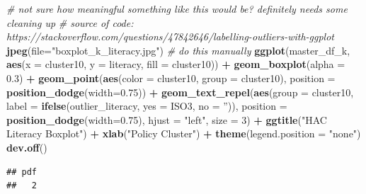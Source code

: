 \documentclass[]{article}
\newenvironment{Shaded}{\begin{snugshade}}{\end{snugshade}}
\newcommand{\CommentTok}[1]{\textcolor[rgb]{0.56,0.35,0.01}{\textit{#1}}}
\newcommand{\DataTypeTok}[1]{\textcolor[rgb]{0.13,0.29,0.53}{#1}}
\newcommand{\DecValTok}[1]{\textcolor[rgb]{0.00,0.00,0.81}{#1}}
\newcommand{\FloatTok}[1]{\textcolor[rgb]{0.00,0.00,0.81}{#1}}
\newcommand{\KeywordTok}[1]{\textcolor[rgb]{0.13,0.29,0.53}{\textbf{#1}}}
\newcommand{\NormalTok}[1]{#1}
\newcommand{\OperatorTok}[1]{\textcolor[rgb]{0.81,0.36,0.00}{\textbf{#1}}}
\newcommand{\StringTok}[1]{\textcolor[rgb]{0.31,0.60,0.02}{#1}}
\begin{document}
\begin{Shaded}
\begin{Highlighting}[]
\CommentTok{# not sure how meaningful something like this would be? definitely needs some cleaning up}
\CommentTok{# source of code: https://stackoverflow.com/questions/47842646/labelling-outliers-with-ggplot}
\KeywordTok{jpeg}\NormalTok{(}\DataTypeTok{file=}\StringTok{"boxplot_k_literacy.jpg"}\NormalTok{)}
\CommentTok{# do this manually}
\KeywordTok{ggplot}\NormalTok{(master_df_k, }\KeywordTok{aes}\NormalTok{(}\DataTypeTok{x =}\NormalTok{ cluster10, }\DataTypeTok{y =}\NormalTok{ literacy, }\DataTypeTok{fill =}\NormalTok{ cluster10)) }\OperatorTok{+}
\StringTok{  }\KeywordTok{geom_boxplot}\NormalTok{(}\DataTypeTok{alpha =} \FloatTok{0.3}\NormalTok{) }\OperatorTok{+}
\StringTok{  }\KeywordTok{geom_point}\NormalTok{(}\KeywordTok{aes}\NormalTok{(}\DataTypeTok{color =}\NormalTok{ cluster10, }\DataTypeTok{group =}\NormalTok{ cluster10), }\DataTypeTok{position =} \KeywordTok{position_dodge}\NormalTok{(}\DataTypeTok{width=}\FloatTok{0.75}\NormalTok{)) }\OperatorTok{+}
\StringTok{  }\KeywordTok{geom_text_repel}\NormalTok{(}\KeywordTok{aes}\NormalTok{(}\DataTypeTok{group =}\NormalTok{ cluster10, }
                \DataTypeTok{label =} \KeywordTok{ifelse}\NormalTok{(outlier_literacy, }
                  \DataTypeTok{yes =}\NormalTok{ ISO3,}
                  \DataTypeTok{no =} \StringTok{''}\NormalTok{)), }
            \DataTypeTok{position =} \KeywordTok{position_dodge}\NormalTok{(}\DataTypeTok{width=}\FloatTok{0.75}\NormalTok{),}
            \DataTypeTok{hjust =} \StringTok{"left"}\NormalTok{, }\DataTypeTok{size =} \DecValTok{3}\NormalTok{) }\OperatorTok{+}\StringTok{ }
\StringTok{  }\KeywordTok{ggtitle}\NormalTok{(}\StringTok{"HAC Literacy Boxplot"}\NormalTok{) }\OperatorTok{+}\StringTok{ }\KeywordTok{xlab}\NormalTok{(}\StringTok{"Policy Cluster"}\NormalTok{) }\OperatorTok{+}\StringTok{ }\KeywordTok{theme}\NormalTok{(}\DataTypeTok{legend.position =} \StringTok{"none"}\NormalTok{)}
\KeywordTok{dev.off}\NormalTok{()}
\end{Highlighting}
\end{Shaded}

\begin{verbatim}
## pdf 
##   2
\end{verbatim}
\end{document}
